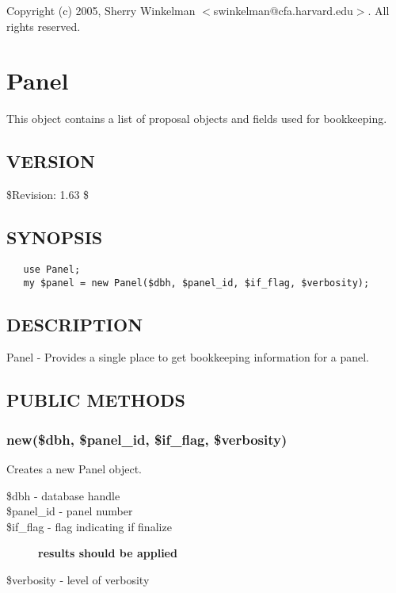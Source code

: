 \documentclass{article}
\begin{document}
Copyright (c) 2005, Sherry Winkelman $<$swinkelman@cfa.harvard.edu$>$. All rights 
reserved.

\clearpage
\section{Panel\label{Panel}}


This object contains a list of proposal objects and fields used for
bookkeeping.

\subsection*{VERSION\label{Panel_VERSION}}


\$Revision: 1.63 \$

\subsection*{SYNOPSIS\label{Panel_SYNOPSIS}}
\begin{verbatim}
   use Panel;
   my $panel = new Panel($dbh, $panel_id, $if_flag, $verbosity);
\end{verbatim}
\subsection*{DESCRIPTION\label{Panel_DESCRIPTION}}


Panel - Provides a single place to get bookkeeping information for a panel.

\subsection*{PUBLIC METHODS\label{Panel_PUBLIC_METHODS}}
\subsubsection*{new(\$dbh, \$panel\_id, \$if\_flag, \$verbosity)\label{Panel_new_dbh_panel_id_if_flag_verbosity_}}


Creates a new Panel object.

\begin{description}

\item[{\$dbh - database handle}] \mbox{}
\item[{\$panel\_id - panel number}] \mbox{}
\item[{\$if\_flag - flag indicating if finalize}] \textbf{results should be applied}
\item[{\$verbosity - level of verbosity}] \mbox{}\end{description}
\end{document}
